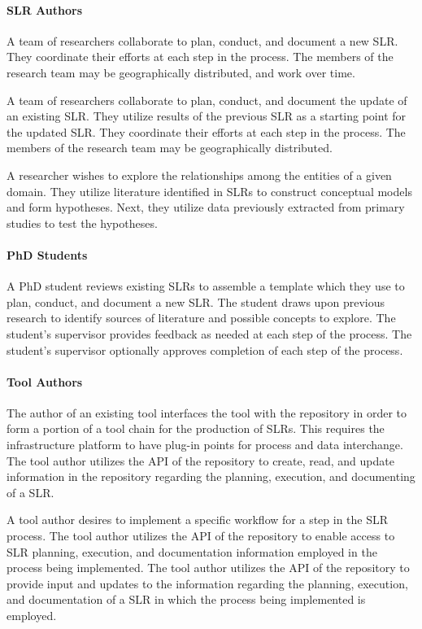 
\paragraph{SLR Authors}
A team of researchers collaborate to plan, conduct, and document a new SLR.  
They coordinate their efforts at each step in the process. 
The members of the research team may be geographically distributed, and work over time.

A team of researchers collaborate to plan, conduct, and document the update of an existing SLR.  
They utilize results of the previous SLR as a starting point for the updated SLR. 
They coordinate their efforts at each step in the process.  
The members of the research team may be geographically distributed.

A researcher wishes to explore the relationships among the entities of a given domain.  
They utilize literature identified in SLRs to construct conceptual models and form hypotheses.  
Next, they utilize data previously extracted from primary studies to test the hypotheses.

\paragraph{PhD Students}
A PhD student reviews existing SLRs to assemble a template which they use to plan, conduct, and document a new SLR.  
The student draws upon previous research to identify sources of literature and possible concepts to explore.  
The student’s supervisor provides feedback as needed at each step of the process.  
The student’s supervisor optionally approves completion of each step of the process.

\paragraph{Tool Authors}
The author of an existing tool interfaces the tool with the repository in order to form a portion of a tool chain for the production of SLRs.  
This requires the infrastructure platform to have plug-in points for process and data interchange. 
The tool author utilizes the API of the repository to create, read, and update information in the repository regarding the planning, execution, and documenting of a SLR.

A tool author desires to implement a specific workflow for a step in the SLR process.  
The tool author utilizes the API of the repository to enable access to SLR planning, execution, and documentation information employed in the process being implemented.  
The tool author utilizes the API of the repository to provide input and updates to the information regarding the planning, execution, and documentation of a SLR in which the process being implemented is employed.


